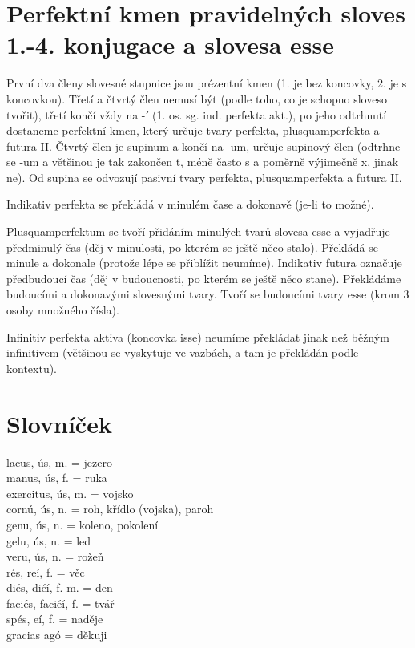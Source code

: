 \documentclass[12pt]{article}					%
\begin{document}
\section{Perfektní kmen pravidelných sloves 1.-4. konjugace a slovesa esse}
První dva členy slovesné stupnice jsou prézentní kmen (1. je bez koncovky, 2. je s koncovkou). Třetí a čtvrtý člen nemusí být (podle toho, co je schopno sloveso tvořit), třetí končí vždy na -í (1. os. sg. ind. perfekta akt.), po jeho odtrhnutí dostaneme perfektní kmen, který určuje tvary perfekta, plusquamperfekta a futura II. Čtvrtý člen je supinum a končí na -um, určuje supinový člen (odtrhne se -um a většinou je tak zakončen t, méně často s a poměrně výjimečně x, jinak ne). Od supina se odvozují pasivní tvary perfekta, plusquamperfekta a futura II.

Indikativ perfekta se překládá v minulém čase a dokonavě (je-li to možné).


Plusquamperfektum se tvoří přidáním minulých tvarů slovesa esse a vyjadřuje předminulý čas (děj v minulosti, po kterém se ještě něco stalo). Překládá se minule a dokonale (protože lépe se přiblížit neumíme). Indikativ futura označuje předbudoucí čas (děj v budoucnosti, po kterém se ještě něco stane). Překládáme budoucími a dokonavými slovesnými tvary. Tvoří se budoucími tvary esse (krom 3 osoby množného čísla).

Infinitiv perfekta aktiva (koncovka isse) neumíme překládat jinak než běžným infinitivem (většinou se vyskytuje ve vazbách, a tam je překládán podle kontextu).


\newpage
\section{Slovníček}
    lacus, ús, m. = jezero\\
    manus, ús, f. = ruka\\
    exercitus, ús, m. = vojsko\\
    cornú, ús, n. = roh, křídlo (vojska), paroh\\
    genu, ús, n. = koleno, pokolení\\
    gelu, ús, n. = led\\
    veru, ús, n. = rožeň\\
    rés, reí, f. = věc\\
    diés, diéí, f. m. = den\\
    faciés, faciéí, f. = tvář\\
    spés, eí, f. = naděje\\
    gracias agó = děkuji\\

    

    
\end{document}
